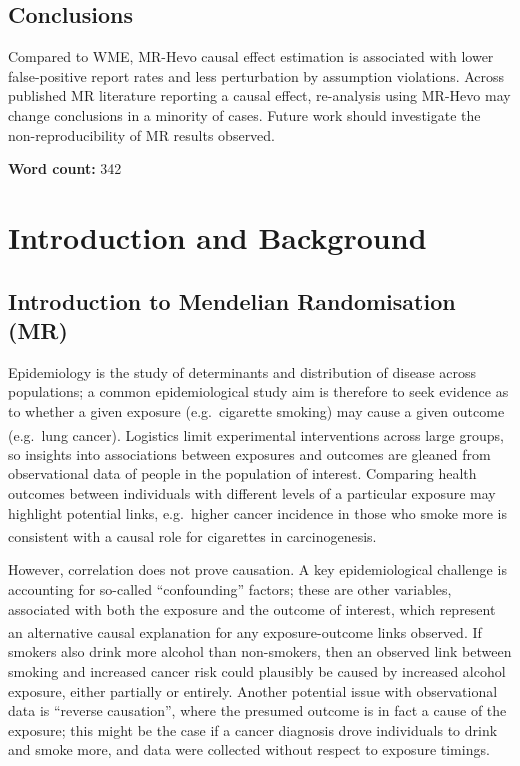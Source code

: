 \documentclass[
]{article}
\begin{document}
\subsection{Conclusions}\label{conclusions}

Compared to WME, MR-Hevo causal effect estimation is associated with lower false-positive report rates and less perturbation by assumption violations. Across published MR literature reporting a causal effect, re-analysis using MR-Hevo may change conclusions in a minority of cases. Future work should investigate the non-reproducibility of MR results observed.

\textbf{Word count:} 342

\newpage

\section{Introduction and Background}\label{introduction-and-background}

\subsection{Introduction to Mendelian Randomisation (MR)}\label{introduction-to-mendelian-randomisation-mr}

Epidemiology is the study of determinants and distribution of disease across populations; a common epidemiological study aim is therefore to seek evidence as to whether a given exposure (e.g.~cigarette smoking) may cause a given outcome (e.g.~lung cancer)\textsuperscript{}. Logistics limit experimental interventions across large groups, so insights into associations between exposures and outcomes are gleaned from observational data of people in the population of interest. Comparing health outcomes between individuals with different levels of a particular exposure may highlight potential links, e.g.~higher cancer incidence in those who smoke more is consistent with a causal role for cigarettes in carcinogenesis\textsuperscript{}.

However, correlation does not prove causation. A key epidemiological challenge is accounting for so-called ``confounding'' factors; these are other variables, associated with both the exposure and the outcome of interest, which represent an alternative causal explanation for any exposure-outcome links observed\textsuperscript{}. If smokers also drink more alcohol than non-smokers, then an observed link between smoking and increased cancer risk could plausibly be caused by increased alcohol exposure, either partially or entirely. Another potential issue with observational data is ``reverse causation'', where the presumed outcome is in fact a cause of the exposure; this might be the case if a cancer diagnosis drove individuals to drink and smoke more, and data were collected without respect to exposure timings.
\end{document}
